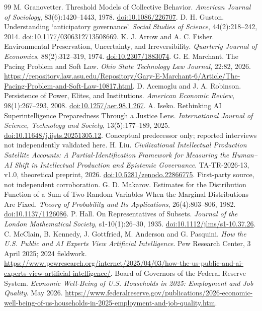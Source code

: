 \documentclass[11pt,a4paper]{article}
\theoremstyle{definition}\newtheorem{definition}{Definition}
\begin{document}
\begin{thebibliography}{99}\small
{} M. Granovetter. Threshold Models of Collective Behavior. \emph{American Journal of Sociology}, 83(6):1420--1443, 1978. \href{https://doi.org/10.1086/226707}{doi:10.1086/226707}.
 D. H. Guston. Understanding `anticipatory governance'. \emph{Social Studies of Science}, 44(2):218--242, 2014. \href{https://doi.org/10.1177/0306312713508669}{doi:10.1177/0306312713508669}.
 K. J. Arrow and A. C. Fisher. Environmental Preservation, Uncertainty, and Irreversibility. \emph{Quarterly Journal of Economics}, 88(2):312--319, 1974. \href{https://doi.org/10.2307/1883074}{doi:10.2307/1883074}.
 G. E. Marchant. The Pacing Problem and Soft Law. \emph{Ohio State Technology Law Journal}, 22:82, 2026. \url{https://repository.law.asu.edu/Repository/Gary-E-Marchant-6/Article/The-Pacing-Problem-and-Soft-Law-10817.html}.
 D. Acemoglu and J. A. Robinson. Persistence of Power, Elites, and Institutions. \emph{American Economic Review}, 98(1):267--293, 2008. \href{https://doi.org/10.1257/aer.98.1.267}{doi:10.1257/aer.98.1.267}.
 A. Iseko. Rethinking AI Superintelligence Preparedness Through a Justice Lens. \emph{International Journal of Science, Technology and Society}, 13(5):177--189, 2025. \href{https://doi.org/10.11648/j.ijsts.20251305.12}{doi:10.11648/j.ijsts.20251305.12}. Conceptual predecessor only; reported interviews not independently validated here.
 H. Liu. \emph{Civilizational Intellectual Production Satellite Accounts: A Partial-Identification Framework for Measuring the Human--AI Shift in Intellectual Production and Epistemic Governance}. TA-TR-2026-13, v1.0, theoretical preprint, 2026. \href{https://doi.org/10.5281/zenodo.22866775}{doi:10.5281/zenodo.22866775}. First-party source, not independent corroboration.
 G. D. Makarov. Estimates for the Distribution Function of a Sum of Two Random Variables When the Marginal Distributions Are Fixed. \emph{Theory of Probability and Its Applications}, 26(4):803--806, 1982. \href{https://doi.org/10.1137/1126086}{doi:10.1137/1126086}.
 P. Hall. On Representatives of Subsets. \emph{Journal of the London Mathematical Society}, s1-10(1):26--30, 1935. \href{https://doi.org/10.1112/jlms/s1-10.37.26}{doi:10.1112/jlms/s1-10.37.26}.
 C. McClain, B. Kennedy, J. Gottfried, M. Anderson and G. Pasquini. \emph{How the U.S. Public and AI Experts View Artificial Intelligence}. Pew Research Center, 3 April 2025; 2024 fieldwork. \url{https://www.pewresearch.org/internet/2025/04/03/how-the-us-public-and-ai-experts-view-artificial-intelligence/}.
 Board of Governors of the Federal Reserve System. \emph{Economic Well-Being of U.S. Households in 2025: Employment and Job Quality}. May 2026. \url{https://www.federalreserve.gov/publications/2026-economic-well-being-of-us-households-in-2025-employment-and-job-quality.htm}.
\end{thebibliography}
\end{document}
